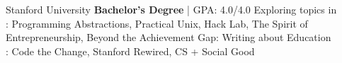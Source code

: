 	{%
		Stanford University}
	{%
		\textbf{Bachelor's Degree} | GPA: 4.0/4.0}
	{%
	Exploring topics in \\
	: Programming Abstractions, Practical Unix, Hack Lab, The Spirit of Entrepreneurship, Beyond the Achievement Gap: Writing about Education \\
	: Code the Change, Stanford Rewired, CS + Social Good \\}
